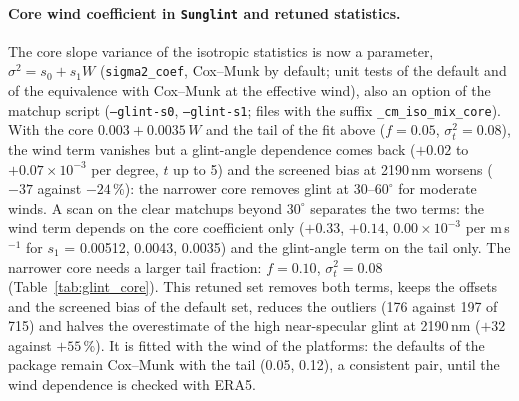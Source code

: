 \documentclass[11pt,a4paper]{article}
\newcommand{\code}[1]{\texttt{#1}}
\begin{document}
\paragraph{Core wind coefficient in \code{Sunglint} and retuned statistics.} The core slope variance of the
isotropic statistics is now a parameter, $\sigma^2 = s_0 + s_1 W$ (\code{sigma2\_coef}, Cox--Munk by default; unit
tests of the default and of the equivalence with Cox--Munk at the effective wind), also an option of the matchup
script (\code{--glint-s0}, \code{--glint-s1}; files with the suffix \code{\_cm\_iso\_mix\_core}). With the core
$0.003 + 0.0035\,W$ and the tail of the fit above ($f=0.05$, $\sigma_t^2=0.08$), the wind term vanishes but a
glint-angle dependence comes back ($+0.02$ to $+0.07\times10^{-3}$ per degree, $t$ up to 5) and the screened bias at
2190\,nm worsens ($-37$ against $-24\,\%$): the narrower core removes glint at 30--$60^\circ$ for moderate winds. A
scan on the clear matchups beyond $30^\circ$ separates the two terms: the wind term depends on the core coefficient
only ($+0.33$, $+0.14$, $0.00\times10^{-3}$ per m\,s$^{-1}$ for $s_1$ = 0.00512, 0.0043, 0.0035) and the glint-angle term
on the tail only. The narrower core needs a larger tail fraction: $f = 0.10$, $\sigma_t^2 = 0.08$
(Table~\ref{tab:glint_core}). This retuned set removes both terms, keeps the offsets and the screened bias of the
default set, reduces the outliers (176 against 197 of 715) and halves the overestimate of the high near-specular
glint at 2190\,nm ($+32$ against $+55\,\%$). It is fitted with the wind of the platforms: the defaults of the package
remain Cox--Munk with the tail (0.05, 0.12), a consistent pair, until the wind dependence is checked with ERA5.
\end{document}
